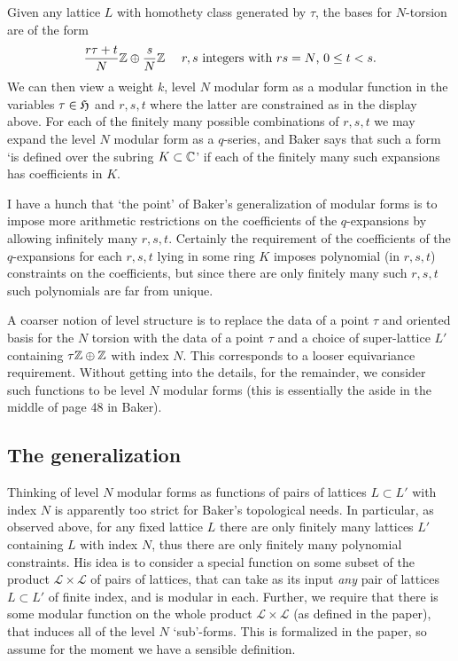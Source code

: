 \documentclass[11pt]{amsart}
\renewcommand{\L}{\mathcal{L}}
\begin{document}
Given any lattice $L$ with homothety class generated by $\tau$, the bases for $N$-torsion are of the form 
	\begin{align*}
		\frac{r \tau +t}{N}\mathbb{Z} \oplus \frac{s}{N}\mathbb{Z} \quad \text{ $r,s$ integers with $rs=N$, $0\leq t <s$.}
	\end{align*}
We can then view a weight $k$, level $N$ modular form as a modular function in the variables $\tau\in \mathfrak{H}$ and $r,s,t$ where the latter are constrained as in the display above. For each of the finitely many possible combinations of $r,s,t$ we may expand the level $N$ modular form as a $q$-series, and Baker says that such a form `is defined over the subring $K\subset \mathbb{C}$' if each of the finitely many such expansions has coefficients in $K$.

I have a hunch that `the point' of Baker's generalization of modular forms is to impose more arithmetic restrictions on the coefficients of the $q$-expansions by allowing infinitely many $r,s,t$. Certainly the requirement of the coefficients of the $q$-expansions for each $r,s,t$ lying in some ring $K$ imposes polynomial (in $r,s,t$) constraints on the coefficients, but since there are only finitely many such $r,s,t$ such polynomials are far from unique.

A coarser notion of level structure is to replace the data of a point $\tau$ and oriented basis for the $N$ torsion with the data of a point $\tau$ and a choice of super-lattice $L'$ containing $\tau \mathbb{Z} \oplus \mathbb{Z}$ with index $N$. This corresponds to a looser equivariance requirement. Without getting into the details, for the remainder, we consider such functions to be level $N$ modular forms (this is essentially the aside in the middle of page 48 in Baker). 

\subsection{The generalization}
Thinking of level $N$ modular forms as functions of pairs of lattices $L\subset L'$ with index $N$ is apparently too strict for Baker's topological needs. In particular, as observed above, for any fixed lattice $L$ there are only finitely many lattices $L'$ containing $L$ with index $N$, thus there are only finitely many polynomial constraints. His idea is to consider a special function on some subset of the product $\L\times \L$ of pairs of lattices, that can take as its input \emph{any} pair of lattices $L\subset L'$ of finite index, and is modular in each. Further, we require that there is some modular function on the whole product $\L\times \L$ (as defined in the paper), that induces all of the level $N$  `sub'-forms. This is formalized in the paper, so assume for the moment we have a sensible definition. 
\end{document}
